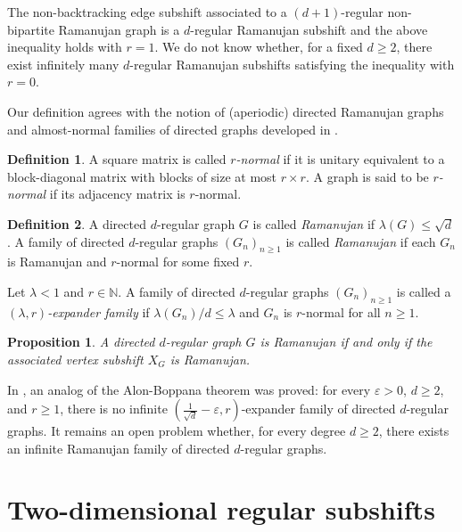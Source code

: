\documentclass[12pt]{article}
\newtheorem{proposition}[theorem]{Proposition}
\theoremstyle{definition}
\newtheorem{definition}{Definition}
\begin{document}
The non-backtracking edge subshift associated to a $(d+1)$-regular non-bipartite Ramanujan graph is a $d$-regular Ramanujan subshift and the above inequality holds with $r=1$. We do not know whether, for a fixed $d\geq 2$, there exist infinitely many $d$-regular Ramanujan subshifts satisfying the inequality with $r=0$.

Our definition agrees with the notion of (aperiodic) directed Ramanujan graphs and almost-normal families of directed graphs developed in \cite{Parzanchevski2020}.

\begin{definition}
A square matrix is called \textit{$r$-normal} if it is unitary equivalent to a block-diagonal
matrix with blocks of size at most $r\times r$. A graph is said to be \textit{$r$-normal} if its
adjacency matrix is $r$-normal.
\end{definition}


\begin{definition}
A directed $d$-regular graph $G$ is called \textit{Ramanujan} if $\lambda(G)\leq \sqrt{d}$. A family of directed $d$-regular graphs $(G_n)_{n\geq 1}$ is called \textit{Ramanujan} if each $G_n$ is Ramanujan and $r$-normal for some fixed $r$.

Let $\lambda<1$ and $r\in\mathbb{N}$.
A family of directed $d$-regular graphs $(G_n)_{n\geq 1}$ is called a
\textit{$(\lambda,r)$-expander family} if $\lambda(G_n)/d\leq\lambda$ and $G_n$ is $r$-normal for all $n\geq 1$.
\end{definition}


\begin{proposition}
A directed $d$-regular graph $G$ is Ramanujan if and only if the associated vertex subshift $X_G$ is Ramanujan.
\end{proposition}

In \cite[Theorem~13.4.3]{Parzanchevski2020}, an analog of the Alon-Boppana theorem was proved: for every $\varepsilon>0$, $d\geq 2$, and $r\geq 1$, there is no infinite $(\tfrac{1}{\sqrt{d}}-\varepsilon,r)$-expander family of directed $d$-regular graphs. It remains an open problem whether, for every degree $d\geq 2$, there exists an infinite Ramanujan family of directed $d$-regular graphs.



\section{Two-dimensional regular subshifts}
\end{document}
